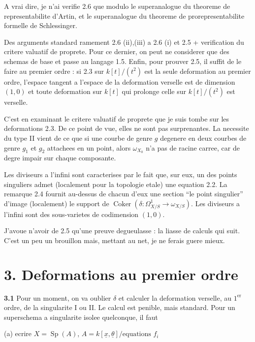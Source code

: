 \documentclass[11pt,a4paper]{article}
\theoremstyle{plain}
\theoremstyle{definition}
\DeclareMathOperator{\Coker}{Coker}
\DeclareMathOperator{\Sp}{Sp}
\begin{document}
A vrai dire, je n'ai verifie 2.6 que modulo le superanalogue du theoreme de representabilite d'Artin, et le superanalogue du theoreme de prorepresentabilite formelle de Schlessinger.

\newpage

Des arguments standard ramement 2.6 (ii),(iii) a 2.6 (i) et 2.5 + verification du critere valuatif de proprete. Pour ce dernier, on peut ne considerer que des schemas de base et passe au langage 1.5. Enfin, pour prouver 2.5, il suffit de le faire au premier ordre : si 2.3 sur $k[t]/(t^2)$ est la seule deformation au premier ordre, l'espace tangent a l'espace de la deformation verselle est de dimension $(1,0)$ et toute deformation sur $k[t]$ qui prolonge celle sur $k[t]/(t^2)$ est verselle.

C'est en examinant le critere valuatif de proprete que je suis tombe sur les deformations 2.3. De ce point de vue, elles ne sont pas surprenantes. La necessite du type II vient de ce que si une courbe de genre $g$ degenere en deux courbes de genre $g_1$ et $g_2$ attachees en un point, alors $\omega_{X_0}$ n'a pas de racine carree, car de degre impair sur chaque composante.

Les diviseurs a l'infini sont caracterises par le fait que, sur eux, un des points singuliers admet (localement pour la topologie etale) une equation 2.2. La remarque 2.4 fournit au-dessus de chacun d'eux une section ``le point singulier'' d'image (localement) le support de $\Coker(\delta : \Omega^1_{X/S} \to \omega_{X/S})$. Les diviseurs a l'infini sont des sous-varietes de codimension $(1,0)$.

J'avoue n'avoir de 2.5 qu'une preuve degueulasse : la liasse de calculs qui suit. C'est un peu un brouillon mais, mettant au net, je ne ferais guere mieux.

\newpage

\section*{3. Deformations au premier ordre}

\noindent \textbf{3.1} Pour un moment, on va oublier $\delta$ et calculer la deformation verselle, au $1^{\text{er}}$ ordre, de la singularite I ou II. Le calcul est penible, mais standard. Pour un superschema a singularite isolee quelconque, il faut

(a) ecrire $X = \Sp(A)$, $A = k[\underline{x}, \underline{\theta}] / \text{equations } f_i$
\end{document}
